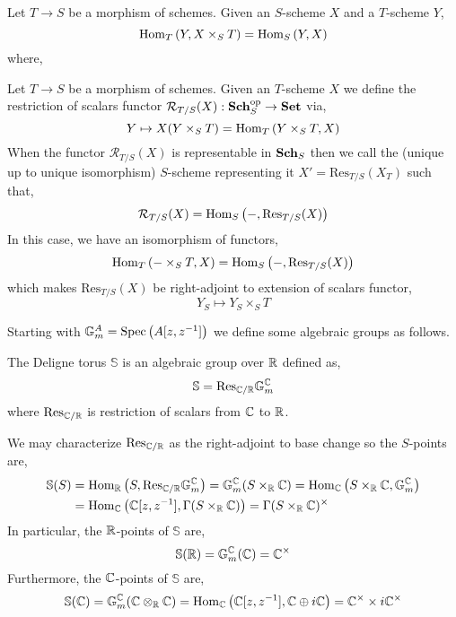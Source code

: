 \documentclass[12pt]{article}
\begin{document}
\renewcommand{\S}{\mathbb{S}}
\newcommand{\Res}{\mathrm{Res}}
\newcommand{\FR}{\mathcal{R}}
\newcommand{\Set}{\mathbf{Set}}
\newcommand{\Nm}{\mathrm{Nm}}

\begin{remark}
Let $T \to S$ be a morphism of schemes. Given an $S$-scheme $X$ and a $T$-scheme $Y$,
\[ \mathrm{Hom}_{T}\left( Y , X \times_S T \right) = \mathrm{Hom}_{S}\left( Y , X \right) \]
where,
\begin{center}
\end{center}
\end{remark}

\begin{definition}
Let $T \to S$ be a morphism of schemes. Given an $T$-scheme $X$ we define the restriction of scalars functor $\FR_{T/S}(X) : \Sch_{S}^{\op} \to \Set$ via,
\[ Y \mapsto X(Y \times_S T) = \mathrm{Hom}_{T}\left( Y \times_S T , X \right)  \]
When the functor $\FR_{T/S}(X)$ is representable in $\mathbf{Sch}_S$ then we call the (unique up to unique isomorphism) $S$-scheme representing it $X' = \Res_{T/S}(X_T)$ such that,
\[ \FR_{T/S}(X) = \Hom{S}{-}{\Res_{T/S}(X)} \]
In this case, we have an isomorphism of functors,
\[  \Hom{T}{- \times_S T}{X} = \Hom{S}{-}{\Res_{T/S}(X)} \]
which makes $\Res_{T/S}(X)$ be right-adjoint to extension of scalars functor,
\[ Y_S \mapsto Y_S \times_S T \] 
\end{definition}

\begin{remark}
Starting with $\mathbb{G}_m^A = \mathrm{Spec}\left( A[z, z^{-1}] \right)$ we define some algebraic groups as follows.
\end{remark}


\begin{definition}
The Deligne torus $\S$ is an algebraic group over $\mathbb{R}$ defined as,
\[ \S = \Res_{\C / \R} \Gm^\C \]
where $\Res_{\C / \R}$ is restriction of scalars from $\mathbb{C}$ to $\mathbb{R}$. 
\end{definition}

\begin{remark}
We may characterize $\Res_{\C / \R}$ as the right-adjoint to base change so the $S$-points are,
\begin{align*}
\S(S) & = \Hom{\R}{S}{\Res_{\C / \R} \Gm^\C} = \Gm^\C(S \times_\R \C) = \Hom{\C}{S \times_\R \C}{\Gm^\C}
\\
& = \Hom{\C}{\C[z, z^{-1}]}{\Gamma(S \times_\R \C)} = \Gamma(S \times_\R \C)^\times
\end{align*}
In particular, the $\mathbb{R}$-points of $\S$ are,
\[ \S(\R) = \Gm^\C(\C) = \C^\times \]
Furthermore, the $\mathbb{C}$-points of $\S$ are,
\[ \S(\C) = \Gm^\C(\C \otimes_\R \C) = \Hom{\C}{\C[z, z^{-1}]}{\C \oplus i \C} = \C^\times \times i \C^\times \] 
\end{remark}
\end{document}
